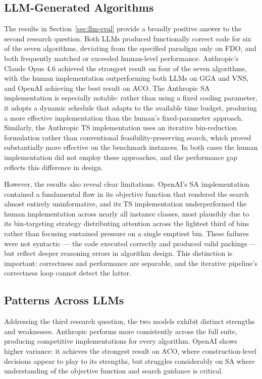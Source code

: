 \documentclass[11pt]{article}
\begin{document}
\subsection{LLM-Generated Algorithms}

The results in Section~\ref{sec:llm-eval} provide a broadly positive answer to the second research 
question. Both LLMs produced functionally correct code for six of the seven 
algorithms, deviating from the specified paradigm only on FDO, and both frequently matched or exceeded human-level performance.
Anthropic's Claude Opus 4.6 achieved the strongest result on four of the seven 
algorithms, with the human implementation outperforming both LLMs on GGA and VNS, 
and OpenAI achieving the best result on ACO. The Anthropic SA implementation is 
especially notable: rather than using a fixed cooling parameter, it adopts a dynamic 
schedule that adapts to the available time budget, producing a more effective 
implementation than the human's fixed-parameter approach. Similarly, the Anthropic TS 
implementation uses an iterative bin-reduction formulation rather than conventional 
feasibility-preserving search, which proved substantially more effective on the 
benchmark instances. In both cases the human implementation did not employ these 
approaches, and the performance gap reflects this difference in design.

However, the results also reveal clear limitations. OpenAI's SA implementation 
contained a fundamental flaw in its objective function that rendered the search almost 
entirely uninformative, and its TS implementation underperformed the human 
implementation across nearly all instance classes, most plausibly due to its 
bin-targeting strategy distributing attention across the lightest third of bins rather 
than focusing sustained pressure on a single emptiest bin. These failures were not 
syntactic --- the code executed correctly and produced valid packings --- but reflect 
deeper reasoning errors in algorithm design. This distinction is important: correctness 
and performance are separable, and the iterative pipeline's correctness loop cannot 
detect the latter.

\subsection{Patterns Across LLMs}

Addressing the third research question, the two models exhibit distinct strengths and 
weaknesses. Anthropic performs more consistently across the full suite, producing 
competitive implementations for every algorithm. OpenAI shows higher variance: it 
achieves the strongest result on ACO, where construction-level decisions appear to 
play to its strengths, but struggles considerably on SA where understanding of the objective function and search guidance is critical.
\end{document}
